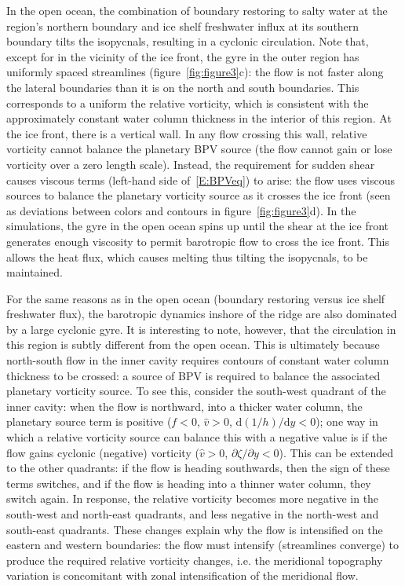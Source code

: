 \documentclass[draft]{agujournal2019}
\begin{document}
In the open ocean, the combination of boundary restoring to salty water at the region's northern boundary and ice shelf freshwater influx at its southern boundary tilts the isopycnals, resulting in a cyclonic circulation. Note that, except for in the vicinity of the ice front, the gyre in the outer region has uniformly spaced streamlines (figure~\ref{fig:figure3}c): the flow is not faster along the lateral boundaries than it is on the north and south boundaries. This corresponds to a uniform the relative vorticity, which is consistent with the approximately constant water column thickness in the interior of this region. At the ice front, there is a vertical wall. In any flow crossing this wall, relative vorticity cannot balance the planetary BPV source (the flow cannot gain or lose vorticity over a zero length scale). Instead, the requirement for sudden shear causes viscous terms (left-hand side of~\eqref{E:BPVeq}) to arise: the flow uses viscous sources to balance the planetary vorticity source as it crosses the ice front (seen as deviations between colors and contours in figure~\ref{fig:figure3}d). In the simulations, the gyre in the open ocean spins up until the shear at the ice front generates enough viscosity to permit barotropic flow to cross the ice front. This allows the heat flux, which causes melting thus tilting the isopycnals, to be maintained.


For the same reasons as in the open ocean (boundary restoring versus ice shelf freshwater flux), the barotropic dynamics inshore of the ridge are also dominated by a large cyclonic gyre. It is interesting to note, however, that the circulation in this region is subtly different from the open ocean. This is ultimately because north-south flow in the inner cavity requires contours of constant water column thickness to be crossed: a source of BPV is required to balance the associated planetary vorticity source. To see this, consider the south-west quadrant of the inner cavity: when the flow is northward, into a thicker water column, the planetary source term is positive ($f<0$, $\hat{v}>0$, $\mathrm{d}(1/h)/\mathrm{d}y<0$); one way in which a relative vorticity source can balance this with a negative value is if the flow gains cyclonic (negative) vorticity ($\hat{v}>0$, $\partial \zeta/\partial y<0$). This can be extended to the other quadrants: if the flow is heading southwards, then the sign of these terms switches, and if the flow is heading into a thinner water column, they switch again. In response, the relative vorticity becomes more negative in the south-west and north-east quadrants, and less negative in the north-west and south-east quadrants. These changes explain why the flow is intensified on the eastern and western boundaries: the flow must intensify (streamlines converge) to produce the required relative vorticity changes, i.e. the meridional topography variation is concomitant with zonal intensification of the meridional flow.
\end{document}
